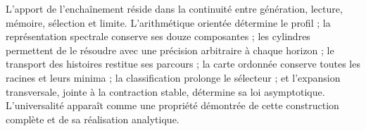 L’apport de l’enchaînement réside dans la continuité entre génération,
lecture, mémoire, sélection et limite. L’arithmétique orientée détermine le
profil ; la représentation spectrale conserve ses douze composantes ; les
cylindres permettent de le résoudre avec une précision arbitraire à chaque horizon ;
le transport des histoires restitue ses parcours ; la carte ordonnée
conserve toutes les racines et leurs minima ; la classification prolonge le
sélecteur ; et l’expansion transversale, jointe à la contraction stable,
détermine sa loi asymptotique. L’universalité apparaît comme une propriété
démontrée de cette construction complète et de sa réalisation analytique.
